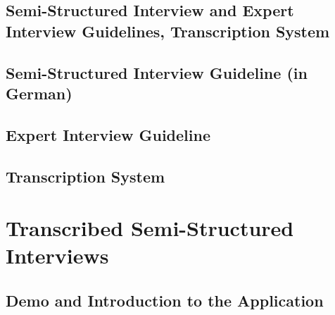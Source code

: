 \clearpage
\newpage
\setcounter{page}{1}
\onecolumn

\setcounter{section}{0}
\setcounter{subsection}{0}
\renewcommand{\theHsection}{Appendix \Alph{section}}
\renewcommand{\thesection}{Appendix \Alph{section}}
\renewcommand{\theHsubsection}{Appendix \Alph{section}.\arabic{subsection}}
\renewcommand{\thesubsection}{Appendix \Alph{section}.\arabic{subsection}}

\begin{landscape}

\section{Semi-Structured Interview and Expert Interview Guidelines, Transcription System}

\subsection{Semi-Structured Interview Guideline (in German)}
\label{appendix:semi-structured}
  

\end{landscape}
\newpage

\twocolumn

\nobalance

\subsection{Expert Interview Guideline}
\label{appendix:expert}
  
  
\subsection{Transcription System}
\label{appendix:transcription}
  


\section{Transcribed Semi-Structured Interviews}
\label{appendix:interviews}

\subsection{Demo and Introduction to the Application}
\label{appendix:demo}
  
  
